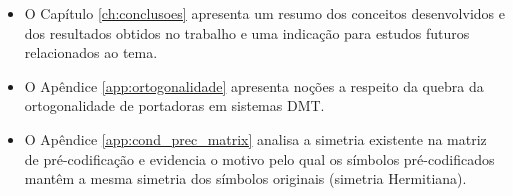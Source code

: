 \begin{itemize}
\item O Capítulo \ref{ch:conclusoes} apresenta um resumo dos conceitos desenvolvidos e dos resultados obtidos no trabalho e uma indicação para estudos futuros relacionados ao tema.
\item O Apêndice \ref{app:ortogonalidade} apresenta noções a respeito da quebra da ortogonalidade de portadoras em sistemas DMT.
\item O Apêndice \ref{app:cond_prec_matrix} analisa a simetria existente na matriz de pré-codificação e evidencia o motivo pelo qual os símbolos pré-codificados mantêm a mesma simetria dos símbolos originais (simetria Hermitiana).
\end{itemize}



